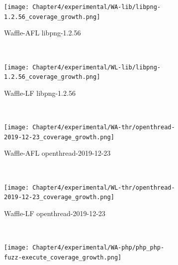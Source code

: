 \begin{figure}[!t]
    \begin{adjustbox}{center,max width=1.3\textwidth}
        \begin{subfigure}[t]{0.55\textwidth}
            \centering
            \texttt{[image: Chapter4/experimental/WA-lib/libpng-1.2.56\_coverage\_growth.png]}
            \vspace*{-5mm}
            \caption{Waffle-AFL libpng-1.2.56}
            \label{gro:b}
            \vspace*{5mm}
        \end{subfigure}
        ~
        \begin{subfigure}[t]{0.55\textwidth}
            \centering
            \texttt{[image: Chapter4/experimental/WL-lib/libpng-1.2.56\_coverage\_growth.png]}
            \vspace*{-5mm}
            \caption{Waffle-LF libpng-1.2.56}
            \label{gro:f}
            \vspace*{5mm}
        \end{subfigure}
    \end{adjustbox}
    ~
    \begin{adjustbox}{center,max width=1.3\textwidth}
        \begin{subfigure}[t]{0.55\textwidth}
            \centering
            \texttt{[image: Chapter4/experimental/WA-thr/openthread-2019-12-23\_coverage\_growth.png]}
            \vspace*{-5mm}
            \caption{Waffle-AFL openthread-2019-12-23}
            \label{gro:e}
            \vspace*{5mm}
        \end{subfigure}
        ~
        \begin{subfigure}[t]{0.55\textwidth}
            \centering
            \texttt{[image: Chapter4/experimental/WL-thr/openthread-2019-12-23\_coverage\_growth.png]}
            \vspace*{-5mm}
            \caption{Waffle-LF openthread-2019-12-23}
            \label{gro:h}
            \vspace*{5mm}
        \end{subfigure}
    \end{adjustbox}
    ~
    \begin{adjustbox}{center,max width=1.3\textwidth}
        \begin{subfigure}[t]{0.55\textwidth}
            \centering
            \texttt{[image: Chapter4/experimental/WA-php/php\_php-fuzz-execute\_coverage\_growth.png]}

\end{subfigure}
\end{adjustbox}
\end{figure}
